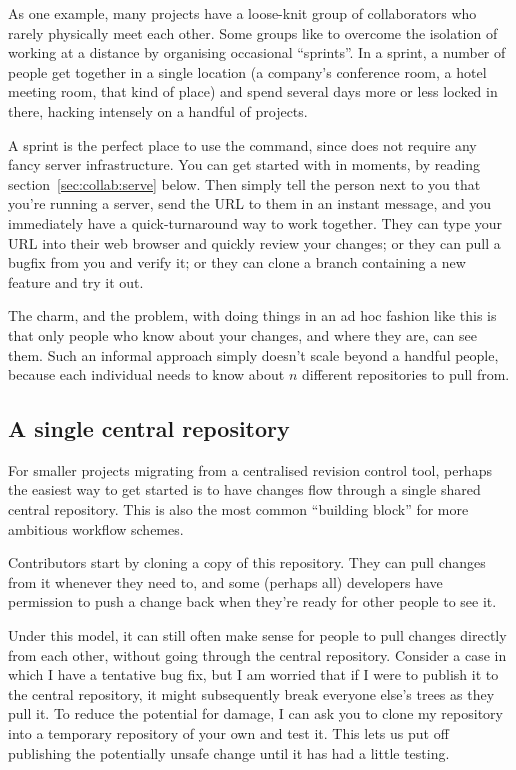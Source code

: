 As one example, many projects have a loose-knit group of collaborators
who rarely physically meet each other.  Some groups like to overcome
the isolation of working at a distance by organising occasional
``sprints''.  In a sprint, a number of people get together in a single
location (a company's conference room, a hotel meeting room, that kind
of place) and spend several days more or less locked in there, hacking
intensely on a handful of projects.

A sprint is the perfect place to use the  command, since
 does not require any fancy server infrastructure.  You
can get started with  in moments, by reading
section~\ref{sec:collab:serve} below.  Then simply tell the person
next to you that you're running a server, send the URL to them in an
instant message, and you immediately have a quick-turnaround way to
work together.  They can type your URL into their web browser and
quickly review your changes; or they can pull a bugfix from you and
verify it; or they can clone a branch containing a new feature and try
it out.

The charm, and the problem, with doing things in an ad hoc fashion
like this is that only people who know about your changes, and where
they are, can see them.  Such an informal approach simply doesn't
scale beyond a handful people, because each individual needs to know
about $n$ different repositories to pull from.

\subsection{A single central repository}

For smaller projects migrating from a centralised revision control
tool, perhaps the easiest way to get started is to have changes flow
through a single shared central repository.  This is also the
most common ``building block'' for more ambitious workflow schemes.

Contributors start by cloning a copy of this repository.  They can
pull changes from it whenever they need to, and some (perhaps all)
developers have permission to push a change back when they're ready
for other people to see it.

Under this model, it can still often make sense for people to pull
changes directly from each other, without going through the central
repository.  Consider a case in which I have a tentative bug fix, but
I am worried that if I were to publish it to the central repository,
it might subsequently break everyone else's trees as they pull it.  To
reduce the potential for damage, I can ask you to clone my repository
into a temporary repository of your own and test it.  This lets us put
off publishing the potentially unsafe change until it has had a little
testing.

